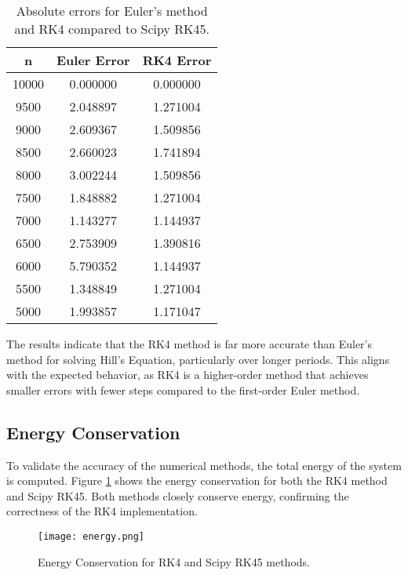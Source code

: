 \documentclass[twocolumn, 11pt]{article}
\begin{document}
\begin{table}[h!]
    \centering
    \begin{tabular}{|c|c|c|}
    \hline
    \textbf{n} & \textbf{Euler Error} & \textbf{RK4 Error} \\
    \hline
    10000 & 0.000000 & 0.000000 \\
    9500  & 2.048897 & 1.271004 \\
    9000  & 2.609367 & 1.509856 \\
    8500  & 2.660023 & 1.741894 \\
    8000  & 3.002244 & 1.509856 \\
    7500  & 1.848882 & 1.271004 \\
    7000  & 1.143277 & 1.144937 \\
    6500  & 2.753909 & 1.390816 \\
    6000  & 5.790352 & 1.144937 \\
    5500  & 1.348849 & 1.271004 \\
    5000  & 1.993857 & 1.171047 \\
    \hline
    \end{tabular}
    \caption{Absolute errors for Euler's method and RK4 compared to Scipy RK45.}
    \label{tab:error_analysis}
\end{table}

The results indicate that the RK4 method is far more accurate than Euler's method for solving Hill's Equation, particularly over longer periods. This aligns with the expected behavior, as RK4 is a higher-order method that achieves smaller errors with fewer steps compared to the first-order Euler method.


\subsection{Energy Conservation}
To validate the accuracy of the numerical methods, the total energy of the system is computed. Figure \ref{fig:energy} shows the energy conservation for both the RK4 method and Scipy RK45. Both methods closely conserve energy, confirming the correctness of the RK4 implementation.

\begin{figure}[h!]
\centering
\texttt{[image: energy.png]}
\caption{Energy Conservation for RK4 and Scipy RK45 methods.}
\label{fig:energy}
\end{figure}
\end{document}
